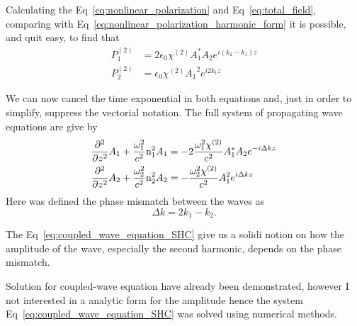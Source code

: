 Calculating the Eq~\ref{eq:nonlinear_polarization} and Eq~\ref{eq:total_field}, comparing with Eq~\ref{eq:nonlinear_polarization_harmonic_form} it is possible, and quit easy, to find that
\begin{subequations}
    \begin{align}
        P^{(2)}_1 &= 2\epsilon_0\chi^{(2)} A^*_1 A_2e^{i(k_2-k_1)z}\\
        P^{(2)}_2 &= \epsilon_0\chi^{(2)} {A_1}^2e^{i2k_1z}
    \end{align}
\end{subequations}


We can now cancel the time exponential in both equations and, just in order to simplify, suppress the vectorial notation. The full system of propagating wave equations are give by 
\begin{subequations}
    \begin{align}
       \frac{\partial^2}{\partial z^2}A_1 +\frac{\omega_1^2}{c^2}\text{n}_1^2 A_1 &= -2\frac{\omega_1^2 \chi^{(2)}}{c^2} A^*_1 A_2e^{-i\Delta kz}\\
       \frac{\partial^2}{\partial z^2}A_2 +\frac{\omega_2^2}{c^2}\text{n}_2^2 A_2 &= -\frac{\omega_2^2\chi^{(2)}}{c^2} A_1^2e^{i\Delta k z}
    \end{align}
    \label{eq:coupled_wave_equation_SHC}
\end{subequations}
Here was defined the phase mismatch between the waves as
\begin{equation}
    \Delta k = 2k_1 - k_2.
\end{equation}

The Eq~\ref{eq:coupled_wave_equation_SHC} give us a solidi notion on how the amplitude of the wave, especially the second harmonic, depends on the phase mismatch. 

Solution for coupled-wave equation have already been demonstrated, however I not interested in a analytic form for the amplitude hence the system Eq~\ref{eq:coupled_wave_equation_SHC} was solved using numerical methods.

